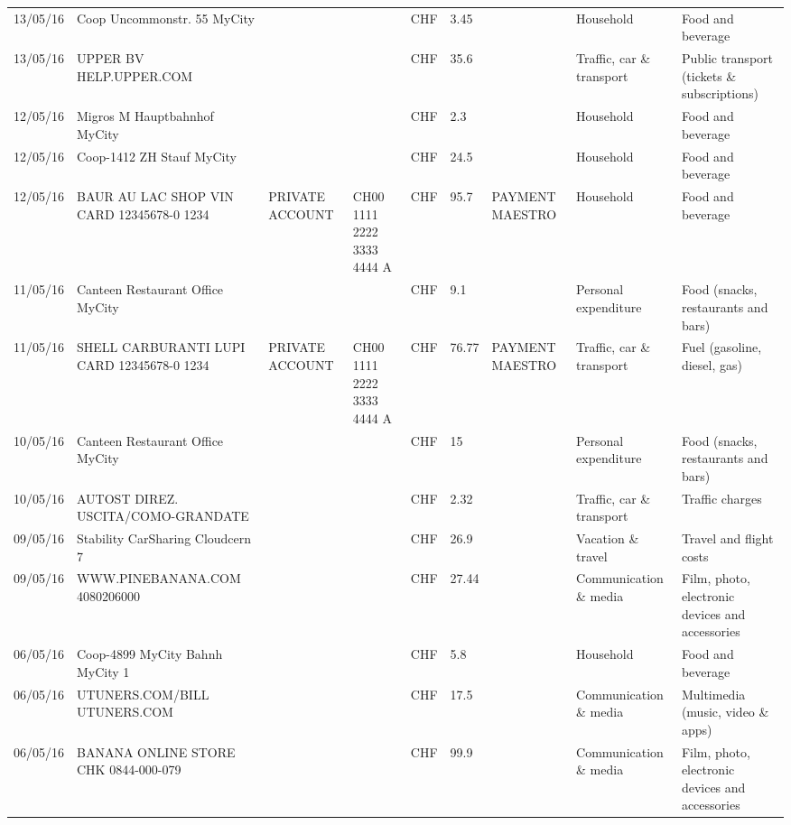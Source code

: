 \begin{landscape}
\begin{adjustwidth}{-2cm}{-2cm}
\begin{tiny}
\begin{longtable}{lp{4cm}llllp{3cm}ll}
		13/05/16 & Coop Uncommonstr. 55   MyCity &       &       & CHF   & 3.45  &       & Household & Food and beverage \\
		13/05/16 & UPPER BV                  HELP.UPPER.COM &       &       & CHF   & 35.6  &       & Traffic, car \& transport & Public transport (tickets \& subscriptions) \\
		12/05/16 & Migros M Hauptbahnhof    MyCity &       &       & CHF   & 2.3   &       & Household & Food and beverage \\
		12/05/16 & Coop-1412 ZH Stauf       MyCity &       &       & CHF   & 24.5  &       & Household & Food and beverage \\
		12/05/16 & BAUR AU LAC SHOP VIN CARD 12345678-0 1234 & PRIVATE ACCOUNT & CH00 1111 2222 3333 4444 A & CHF   & 95.7  & PAYMENT MAESTRO & Household & Food and beverage \\
		11/05/16 & Canteen Restaurant Office      MyCity &       &       & CHF   & 9.1   &       & Personal expenditure & Food (snacks, restaurants and bars) \\
		11/05/16 & SHELL CARBURANTI LUPI CARD 12345678-0 1234 & PRIVATE ACCOUNT & CH00 1111 2222 3333 4444 A & CHF   & 76.77 & PAYMENT MAESTRO & Traffic, car \& transport & Fuel (gasoline, diesel, gas) \\
		10/05/16 & Canteen Restaurant Office      MyCity &       &       & CHF   & 15    &       & Personal expenditure & Food (snacks, restaurants and bars) \\
		10/05/16 & AUTOST DIREZ. USCITA/COMO-GRANDATE &       &       & CHF   & 2.32  &       & Traffic, car \& transport & Traffic charges \\
		09/05/16 & Stability CarSharing      Cloudcern 7 &       &       & CHF   & 26.9  &       & Vacation \& travel & Travel and flight costs \\
		09/05/16 & WWW.PINEBANANA.COM           4080206000 &       &       & CHF   & 27.44 &       & Communication \& media & Film, photo, electronic devices and accessories \\
		06/05/16 & Coop-4899 MyCity Bahnh   MyCity 1 &       &       & CHF   & 5.8   &       & Household & Food and beverage \\
		06/05/16 & UTUNERS.COM/BILL          UTUNERS.COM &       &       & CHF   & 17.5  &       & Communication \& media & Multimedia (music, video \& apps) \\
		06/05/16 & BANANA ONLINE STORE CHK   0844-000-079 &       &       & CHF   & 99.9  &       & Communication \& media & Film, photo, electronic devices and accessories \\

\end{longtable}
\end{tiny}
\end{adjustwidth}
\end{landscape}
